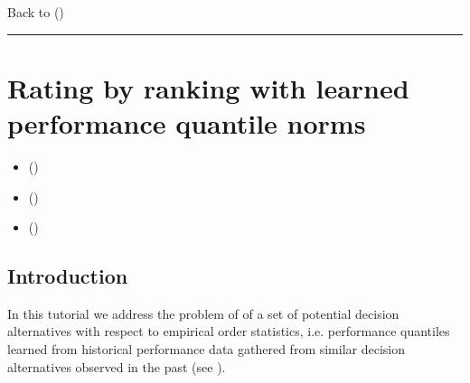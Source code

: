 \documentclass[a4paper,12pt,english]{sphinxhowto}
\begin{document}
Back to {\hyperref[\detokenize{tutorial:tutorial-label}]{}} ()


\bigskip\hrule\bigskip



\section{Rating by ranking with learned performance quantile norms}
\label{\detokenize{tutorial:rating-by-ranking-with-learned-performance-quantile-norms}}\label{\detokenize{tutorial:rating-tutorial-label}}
\begin{sphinxShadowBox}
\begin{itemize}
\item {} 
\label{\detokenize{tutorial:id286}}{\hyperref[\detokenize{tutorial:id77}]{}} ()

\item {} 
\label{\detokenize{tutorial:id287}}{\hyperref[\detokenize{tutorial:incremental-learning-of-historical-performance-quantiles}]{}} ()

\item {} 
\label{\detokenize{tutorial:id288}}{\hyperref[\detokenize{tutorial:rating-by-ranking-new-performances-with-quantile-norms}]{}} ()

\end{itemize}
\end{sphinxShadowBox}


\subsection{Introduction}
\label{\detokenize{tutorial:id77}}
In this tutorial we address the problem of  of a set of potential decision alternatives with respect to empirical order statistics, i.e. performance quantiles learned from historical performance data gathered from similar decision alternatives observed in the past (see ).
\end{document}

